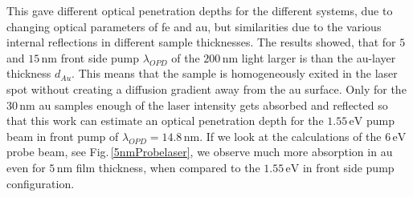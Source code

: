 \documentclass[a4paper,12pt,twoside]{article}
\begin{document}
This gave different optical penetration depths for the different systems, due to changing optical parameters of \gls{fe} and \gls{au}, but similarities due to the various internal reflections in different sample thicknesses. The results showed, that for $5$ and $15\,\mathrm{nm}$ front side pump $\lambda_{OPD}$ of the $200\,\mathrm{nm}$ light larger is than the \gls{au}-layer thickness $d_{Au}$. This means that the sample is homogeneously exited in the laser spot without creating a diffusion gradient away from the \gls{au} surface.
Only for the $30\,\mathrm{\mbox{nm}}$ \gls{au} samples enough of the laser intensity gets absorbed and reflected so that this work can estimate an optical penetration depth for the $1.55\,\mathrm{\mbox{eV}}$ pump beam in front pump of $\lambda_{OPD} = 14.8\,\mathrm{nm}$. If we look at the calculations of the $6\,\mathrm{\mbox{eV}}$ probe beam, see Fig.\,\ref{5nmProbelaser}, we observe much more absorption in \gls{au} even for $5\,\mathrm{\mbox{nm}}$ film thickness, when compared to the $1.55\,\mathrm{\mbox{eV}}$ in front side pump configuration.
\end{document}
